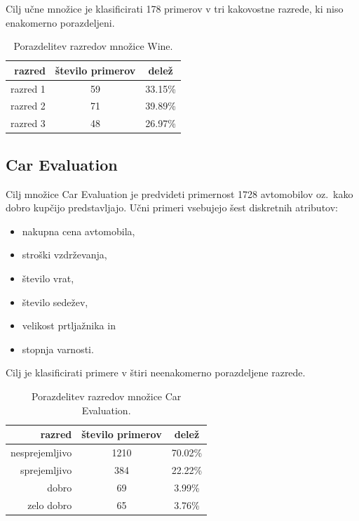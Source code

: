 \documentclass[a4paper,12pt,openright]{book}
\begin{document}
    Cilj učne množice je klasificirati 178 primerov v tri kakovostne razrede, ki niso enakomerno porazdeljeni.

    \begin{table}[H]
        \centering
        \begin{tabular}{||rcc||}
            \hline
            razred  & število primerov & delež   \\ \hline
            razred 1 & 59               & 33.15\% \\ \hline
            razred 2 & 71               & 39.89\% \\ \hline
            razred 3 & 48               & 26.97\% \\ \hline
        \end{tabular}
        \caption{Porazdelitev razredov množice Wine.}
        \label{tab:wine_opis}
    \end{table}

    \subsection{Car Evaluation}\label{subsec:car-evaluation}
    Cilj množice Car Evaluation je predvideti primernost 1728 avtomobilov oz.\ kako dobro kupčijo predstavljajo.
    Učni primeri vsebujejo šest diskretnih atributov:
    \begin{itemize}
        \item nakupna cena avtomobila,
        \item stroški vzdrževanja,
        \item število vrat,
        \item število sedežev,
        \item velikost prtljažnika in
        \item stopnja varnosti.
    \end{itemize}

    Cilj je klasificirati primere v štiri neenakomerno porazdeljene razrede.

    \begin{table}[H]
        \centering
        \begin{tabular}{||rcc||}
            \hline
            razred         & število primerov & delež   \\ \hline
            nesprejemljivo & 1210             & 70.02\% \\ \hline
            sprejemljivo   & 384              & 22.22\% \\ \hline
            dobro          & 69               & 3.99\%  \\ \hline
            zelo dobro     & 65               & 3.76\%  \\ \hline
        \end{tabular}
        \caption{Porazdelitev razredov množice Car Evaluation.}
        \label{tab:car_opis}
    \end{table}
\end{document}
